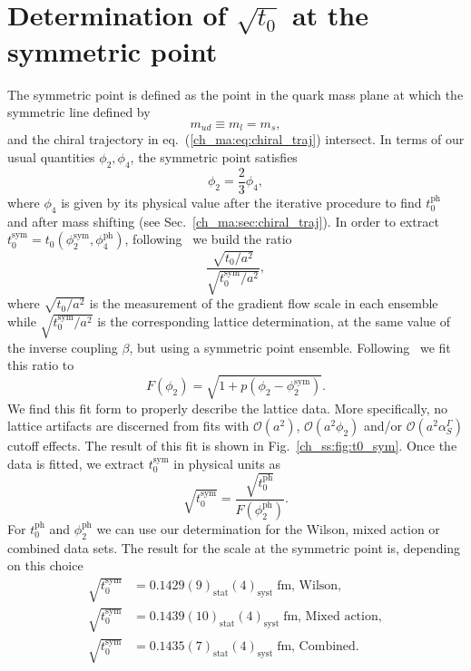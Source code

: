 \section{Determination of $\sqrt{t_0}$ at the symmetric point}

The symmetric point is defined as the point in the quark mass plane at which the symmetric line defined by
\begin{equation}
m_{ud}\equiv m_l=m_s,
\end{equation}
and the chiral trajectory in eq.~(\ref{ch_ma:eq:chiral_traj}) intersect. In terms of our usual quantities $\phi_2,\phi_4$, the symmetric point satisfies
\begin{equation}
\phi_2=\frac{2}{3}\phi_4,
\end{equation}
where $\phi_4$ is given by its physical value after the iterative procedure to find $t_0^{\textrm{ph}}$ and after mass shifting (see Sec.~\ref{ch_ma:sec:chiral_traj}). In order to extract $t_0^{\textrm{sym}}=t_0(\phi_2^{\textrm{sym}},\phi_4^{\textrm{ph}})$, following~\citep{Strassberger:2023xnj} we build the ratio
\begin{equation}
\frac{\sqrt{t_0/a^2}}{\sqrt{t_0^{\textrm{sym}}/a^2}},
\end{equation}
where $\sqrt{t_0/a^2}$ is the measurement of the gradient flow scale in each ensemble while $\sqrt{t_0^{\textrm{sym}}/a^2}$ is the corresponding lattice determination, at the same value of the inverse coupling $\beta$, but using a symmetric point ensemble. Following~\citep{Strassberger:2023xnj} we fit this ratio to
\begin{equation}
\label{ch_ss:eq:fit_t0_sym}
F(\phi_2)=\sqrt{1+p(\phi_2-\phi_2^{\textrm{sym}})}.
\end{equation}
We find this fit form to properly describe the lattice data. More specifically, no lattice artifacts are discerned from fits with $\mathcal{O}(a^2)$, $\mathcal{O}(a^2\phi_2)$ and/or $\mathcal{O}(a^2\alpha_S^{\Gamma})$ cutoff effects. The result of this fit is shown in Fig.~\ref{ch_ss:fig:t0_sym}. Once the data is fitted, we extract $t_0^{\textrm{sym}}$ in physical units as
\begin{equation}
\sqrt{t_0^{\textrm{sym}}}=\frac{\sqrt{t_0^{\textrm{ph}}}}{F(\phi_2^{\textrm{ph}})}.
\end{equation}
For $t_0^{\textrm{ph}}$ and $\phi_2^{\textrm{ph}}$ we can use our determination for the Wilson, mixed action or combined data sets. The result for the scale at the symmetric point is, depending on this choice
\begin{align}
\label{ch_ss:eq:t0_sym}
\sqrt{t_0^{\textrm{sym}}}&=0.1429(9)_{\textrm{stat}}(4)_{\textrm{syst}}\;\textrm{fm, Wilson}, \\
\sqrt{t_0^{\textrm{sym}}}&=0.1439(10)_{\textrm{stat}}(4)_{\textrm{syst}}\;\textrm{fm, Mixed action}, \\
\sqrt{t_0^{\textrm{sym}}}&=0.1435(7)_{\textrm{stat}}(4)_{\textrm{syst}}\;\textrm{fm, Combined}.
\end{align}

